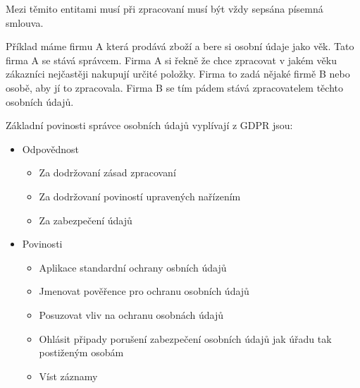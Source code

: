 \documentclass[12pt,a4paper,czech]{report}
\begin{document}
Mezi těmito entitami musí při zpracovaní musí být vždy sepsána písemná smlouva.

Příklad máme firmu A která prodává zboží a bere si osobní údaje jako věk. Tato firma A se stává správcem. Firma A si řekně že chce zpracovat v jakém věku zákazníci nejčastěji nakupují určité položky. Firma to zadá nějaké firmě B nebo osobě, aby jí to zpracovala. Firma B se tím pádem stává zpracovatelem těchto osobních údajů.

Základní povinosti správce osobních údajů vyplívají z GDPR jsou:
\begin{itemize}
    \item Odpovědnost
    \begin{itemize}
        \item Za dodržovaní zásad zpracovaní
        \item Za dodržovaní poviností upravených nařízením
        \item Za zabezpečení údajů
    \end{itemize}
    \item Povinosti
    \begin{itemize}
        \item Aplikace standardní ochrany osbních údajů
        \item Jmenovat pověřence pro ochranu osobních údajů
        \item Posuzovat vliv na ochranu osobnách údajů
        \item Ohlásit připady porušení zabezpečení osobních údajů jak úřadu tak postiženým osobám
        \item Víst záznamy
    \end{itemize}
\end{itemize}
\end{document}
